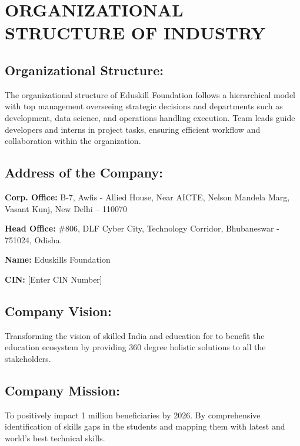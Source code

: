 \documentclass[12pt, a4paper, oneside]{report}
\begin{document}
\chapter{ORGANIZATIONAL STRUCTURE OF INDUSTRY}

\section{Organizational Structure:}
The organizational structure of Eduskill Foundation follows a hierarchical model with top management overseeing strategic decisions and departments such as development, data science, and operations handling execution. Team leads guide developers and interns in project tasks, ensuring efficient workflow and collaboration within the organization.


\section{Address of the Company:}

\noindent \textbf{Corp. Office:} B-7, Awfis - Allied House, Near AICTE, Nelson Mandela Marg, 
Vasant Kunj, New Delhi -- 110070

\noindent \textbf{Head Office:} \#806, DLF Cyber City, Technology Corridor, 
Bhubaneswar - 751024, Odisha.

\noindent \textbf{Name:} Eduskills Foundation

\noindent \textbf{CIN:} [Enter CIN Number]

\section{Company Vision:}

Transforming the vision of skilled India and education for to benefit the education 
ecosystem by providing 360 degree holistic solutions to all the stakeholders.

\section{Company Mission:}

To positively impact 1 million beneficiaries by 2026.
By comprehensive identification of skills gaps in the students and mapping them with 
latest and world's best technical skills.
\end{document}
